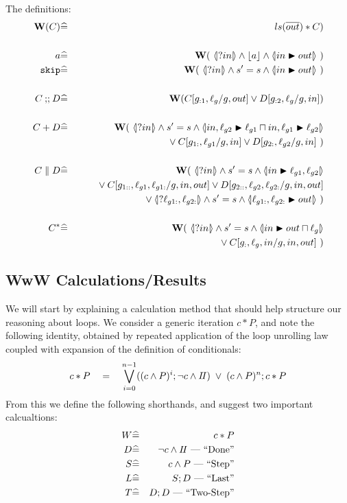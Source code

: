 The definitions:
\begin{eqnarray*}
   \W(C) &\defs& ls(\B{out}) * C)
\\
\\ a &\defs&\W(~\LS{in} \land \ado a \land \LUPD{in}{out}~)
\\ \cskip
   &\defs&
   \W(~\LS{in} \land \ss \land \LUPD{in}{out}~)
\\
\\ C \cseq D
   &\defs&
   \W(C[g_{:1},\ell_g/g,out] \lor D[g_{:2},\ell_g/g,in])
\\
\\ C + D
   &\defs&
   \W(~\LS{in}
   \land \ss
   \land \LNDC{in,\ell_{g2}}{\ell_{g1}}
                {in,\ell_{g1}}{\ell_{g2}}
\\ && \qquad {} \lor
   C[g_{1:},\ell_{g1}/g,in] \lor D[g_{2:},\ell_{g2}/g,in]~)
\\
\\ C \parallel D
   &\defs&
   \W(~\LS{in}
   \land \ss
   \land \LUPD{in}{\ell_{g1},\ell_{g2}}
\\ && \qquad {}\lor
   C[g_{1::},\ell_{g1},\ell_{g1:}/g,in,out]
   \lor D[g_{2::},\ell_{g2},\ell_{g2:}/g,in,out]
\\ && \qquad {}\lor
   \LS{\ell_{g1:},\ell_{g2:}}
   \land \ss
   \land \LUPD{\ell_{g1:},\ell_{g2:}}{out}~)
\\
\\ C^*
   &\defs&
   \W(~\LS{in}
   \land \ss
   \land \LUPD{in}{out \ndc \ell_g}
\\ && \qquad {}\lor
   C[g_{:},\ell_g,in/g,in,out]~)
\end{eqnarray*}

\subsection{WwW Calculations/Results}

We will start by explaining a calculation method
that should help structure our reasoning about loops.
We consider a generic iteration $c*P$,
and note the following identity,
obtained by repeated application of the loop unrolling law
coupled with expansion of the definition of conditionals:
\begin{equation}\label{eqn:unroll-n-times}
   c * P
   \quad=\quad
   \bigvee_{i=0}^{n-1} ( (c \land P)^i ; \lnot c \land I\!I)
   \;\lor\;
   (c \land P)^n ; c * P
\end{equation}
From this we define the following shorthands,
and suggest two important calcualtions:
\begin{eqnarray*}
   W &\widehat=& c * P
\\ D &\widehat=& \lnot c \land I\!I \textrm{ --- ``Done''}
\\ S &\widehat=& c \land P \textrm{ --- ``Step''}
\\ L &\widehat=& S ; D \textrm{ --- ``Last''}
\\ T &\widehat=& D ; D \textrm{ --- ``Two-Step''}
\end{eqnarray*}

